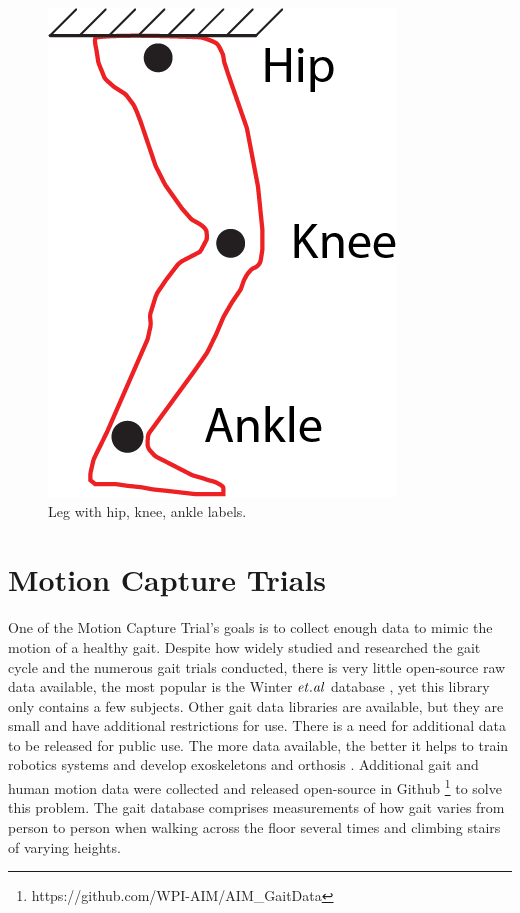 \begin{figure}[h!]
    \centering
    \includegraphics{images/gait_data/leg_joints_label.png}
    \caption[Leg with Hip, Knee, Ankle Labels]{Leg with hip, knee, ankle labels.}
    \label{fig:leg_with_label}
\end{figure}


\section{Motion Capture Trials}

One of the Motion Capture Trial's goals is to collect enough data to mimic the motion of a healthy gait. Despite how widely studied and researched the gait cycle and the numerous gait trials conducted, there is very little open-source raw data available, the most popular is the Winter $\it{et. al}$ database \cite{winter1991biomechanics}, yet this library only contains a few subjects. Other gait data libraries are available, but they are small and have additional restrictions for use. There is a need for additional data to be released for public use. The more data available, the better it helps to train robotics systems and develop exoskeletons and orthosis \cite{moore2015elaborate}. Additional gait and human motion data were collected and released open-source in Github \footnote{https://github.com/WPI-AIM/AIM\_GaitData} to solve this problem. The gait database comprises measurements of how gait varies from person to person when walking across the floor several times and climbing stairs of varying heights. 


